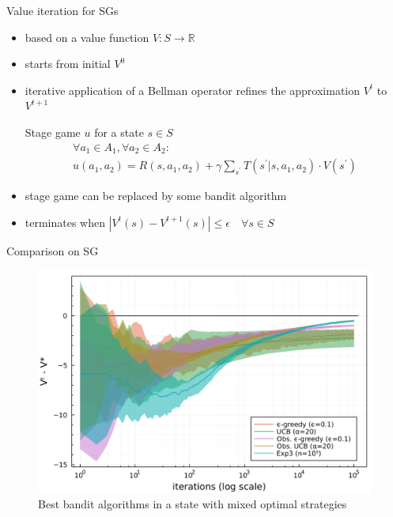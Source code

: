 \documentclass{beamer}
\begin{document}
\begin{frame}{Value iteration for SGs}
    \begin{itemize}
        \item based on a value function $V: S \to \mathbb{R}$
        \item starts from initial $V^0$
        \item iterative application of a Bellman operator refines the approximation $V^t$ to $V^{t+1}$
        \begin{block}{Stage game $u$ for a state $s \in S$}
            \setlength\abovedisplayskip{0pt}
            \begin{multline*}
                \forall a_1 \in A_1, \forall a_2 \in A_2: \\
                u(a_1, a_2) = R(s, a_1, a_2) + \gamma \sum_{s^{\prime}}T(s^{\prime} | s, a_1, a_2) \cdot V(s^{\prime})
            \end{multline*}
        \end{block}
        \item stage game can be replaced by some bandit algorithm
        \item terminates when $|V^t(s) - V^{t+1}(s)| \leq \epsilon \quad \forall s \in S$
    \end{itemize}
\end{frame}

\begin{frame}{Comparison on SG}
    \begin{figure}
        \centering
        \includegraphics[width=1\textwidth]{./tag_3_01_EpsilonGreedy_UCB_ObservableEpsilonGreedy_ObservableUCB_Exp3_LinT_3_3.png}
        \caption{Best bandit algorithms in a state with mixed optimal strategies}
    \end{figure}
\end{frame}
\end{document}

